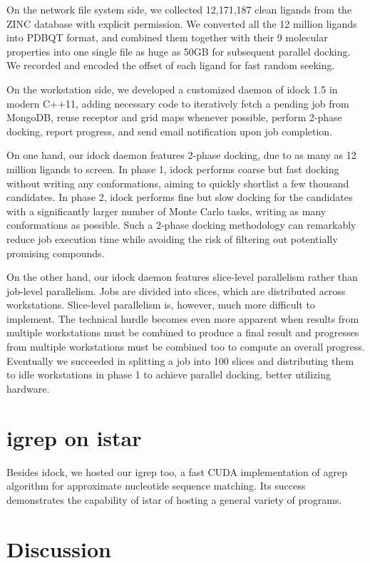 \documentclass{bioinfo}
\begin{document}
On the network file system side, we collected 12,171,187 clean ligands from the ZINC database \citep{532,1178} with explicit permission. We converted all the 12 million ligands into PDBQT format, and combined them together with their 9 molecular properties into one single file as huge as 50GB for subsequent parallel docking. We recorded and encoded the offset of each ligand for fast random seeking.

On the workstation side, we developed a customized daemon of idock 1.5 in modern C++11, adding necessary code to iteratively fetch a pending job from MongoDB, reuse receptor and grid maps whenever possible, perform 2-phase docking, report progress, and send email notification upon job completion.

On one hand, our idock daemon features 2-phase docking, due to as many as 12 million ligands to screen. In phase 1, idock performs coarse but fast docking without writing any conformations, aiming to quickly shortlist a few thousand candidates. In phase 2, idock performs fine but slow docking for the candidates with a significantly larger number of Monte Carlo tasks, writing as many conformations as possible. Such a 2-phase docking methodology can remarkably reduce job execution time while avoiding the risk of filtering out potentially promising compounds.

On the other hand, our idock daemon features slice-level parallelism rather than job-level parallelism. Jobs are divided into slices, which are distributed across workstations. Slice-level parallelism is, however, much more difficult to implement. The technical hurdle becomes even more apparent when results from multiple workstations must be combined to produce a final result and progresses from multiple workstations must be combined too to compute an overall progress. Eventually we succeeded in splitting a job into 100 slices and distributing them to idle workstations in phase 1 to achieve parallel docking, better utilizing hardware.

\section{igrep on istar}

Besides idock, we hosted our igrep \citep{1138} too, a fast CUDA implementation of agrep algorithm for approximate nucleotide sequence matching. Its success demonstrates the capability of istar of hosting a general variety of programs.

\section{Discussion}
\end{document}
